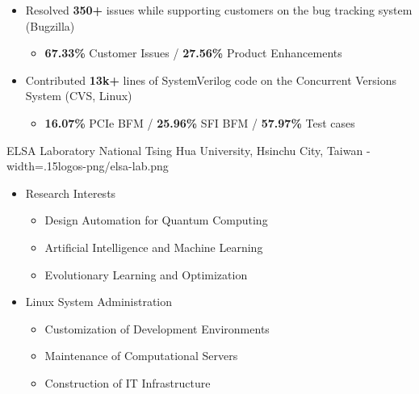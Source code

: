 \documentclass{cvclass}
\newcommand{\simplemmyy}[3]{\shortmmyyformat\formatdate{#3}{#2}{#1}}
\begin{document}
{\begin{itemize}
\begin{itemize}
        \end{itemize}
        \item Resolved \textbf{350+} issues while supporting customers on the bug tracking system (Bugzilla)
        \begin{itemize}
            \item {\textbf{67.33\%} Customer Issues / \textbf{27.56\%} Product Enhancements}
        \end{itemize}
        \item Contributed \textbf{13k+} lines of SystemVerilog code on the Concurrent Versions System (CVS, Linux)
        \begin{itemize}
            \item \textbf{16.07\%} PCIe BFM / \textbf{25.96\%} SFI BFM / \textbf{57.97\%} Test cases
        \end{itemize}
    \end{itemize}}

    {ELSA Laboratory}
    {National Tsing Hua University, Hsinchu City, Taiwan}
    {\simplemmyy{2016}{2}{15} - \simplemmyy{2021}{6}{30}}
    {width=.15\linewidth}{logos-png/elsa-lab.png}
    {\begin{itemize}
        \item Research Interests
        \begin{itemize}
            \item Design Automation for Quantum Computing~\cite{chang2022mapping}
            \item Artificial Intelligence and Machine Learning~\cite{chang2022reusability,chen2024composing}
            \item Evolutionary Learning and Optimization~\cite{chang2022reusability}
        \end{itemize}
        \item Linux System Administration
        \begin{itemize}
            \item Customization of Development Environments
            \item Maintenance of Computational Servers
            \item Construction of IT Infrastructure
        \end{itemize}
    \end{itemize}}

\end{document}
